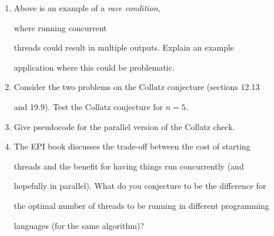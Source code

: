 \documentclass{article}
\begin{document}
\begin{enumerate}
        \vspace{1in}



    \item Above is an  example of a \emph{race condition},

        where running concurrent

        threads could result in multiple outputs.  Explain an example

        application where this could be problematic.

        \vspace{3in}



    \pagebreak

    \item Consider the two problems on the Collatz conjecture (sections 12.13

        and 19.9).  Test the Collatz conjecture for $n=5$.

        \vspace{1in}



    \item Give pseudocode for the parallel version of the Collatz check.

        \vspace{3in}



    \item The EPI book discusses the trade-off between the cost of starting

        threads and the benefit for having things run concurrently (and

        hopefully in parallel).  What do you conjecture to be the difference for

        the optimal number of threads to be running in different programming

        languages (for the same algorithm)?

\end{enumerate}
\end{document}
